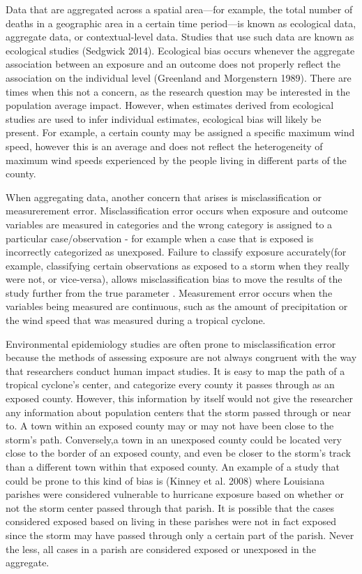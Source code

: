 \documentclass[]{article}
\begin{document}
Data that are aggregated across a spatial area---for example, the total
number of deaths in a geographic area in a certain time period---is
known as ecological data, aggregate data, or contextual-level data.
Studies that use such data are known as ecological studies (Sedgwick
2014). Ecological bias occurs whenever the aggregate association between
an exposure and an outcome does not properly reflect the association on
the individual level (Greenland and Morgenstern 1989). There are times
when this not a concern, as the research question may be interested in
the population average impact. However, when estimates derived from
ecological studies are used to infer individual estimates, ecological
bias will likely be present. For example, a certain county may be
assigned a specific maximum wind speed, however this is an average and
does not reflect the heterogeneity of maximum wind speeds experienced by
the people living in different parts of the county.

When aggregating data, another concern that arises is misclassification
or measurerement error. Misclassification error occurs when exposure and
outcome variables are measured in categories and the wrong category is
assigned to a particular case/observation - for example when a case that
is exposed is incorrectly categorized as unexposed. Failure to classify
exposure accurately(for example, classifying certain observations as
exposed to a storm when they really were not, or vice-versa), allows
misclassification bias to move the results of the study further from the
true parameter . Measurement error occurs when the variables being
measured are continuous, such as the amount of precipitation or the wind
speed that was measured during a tropical cyclone.

Environmental epidemiology studies are often prone to misclassification
error because the methods of assessing exposure are not always congruent
with the way that researchers conduct human impact studies. It is easy
to map the path of a tropical cyclone's center, and categorize every
county it passes through as an exposed county. However, this information
by itself would not give the researcher any information about population
centers that the storm passed through or near to. A town within an
exposed county may or may not have been close to the storm's path.
Conversely,a town in an unexposed county could be located very close to
the border of an exposed county, and even be closer to the storm's track
than a different town within that exposed county. An example of a study
that could be prone to this kind of bias is (Kinney et al. 2008) where
Louisiana parishes were considered vulnerable to hurricane exposure
based on whether or not the storm center passed through that parish. It
is possible that the cases considered exposed based on living in these
parishes were not in fact exposed since the storm may have passed
through only a certain part of the parish. Never the less, all cases in
a parish are considered exposed or unexposed in the aggregate.
\end{document}
